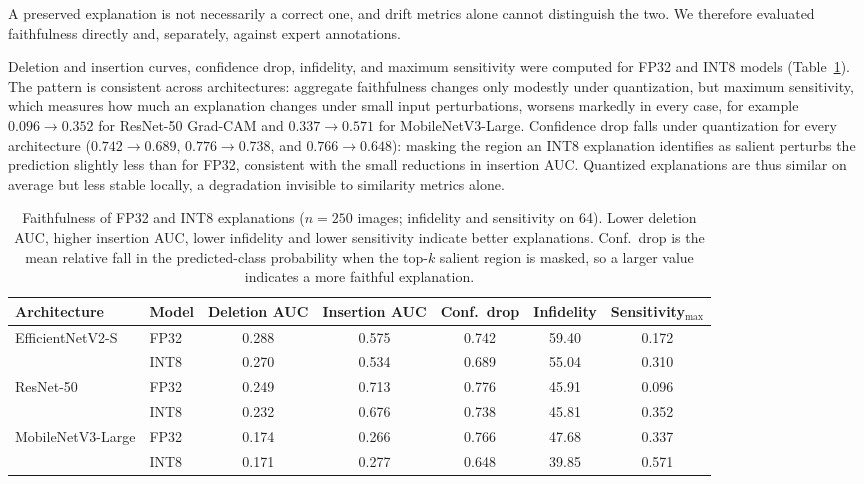 \documentclass[fleqn,10pt]{wlscirep}
\begin{document}
A preserved explanation is not necessarily a correct one, and drift metrics alone cannot distinguish the two. We therefore evaluated faithfulness directly and, separately, against expert annotations.

Deletion and insertion curves, confidence drop, infidelity, and maximum sensitivity were computed for FP32 and INT8 models (Table~\ref{tab:faithfulness}). The pattern is consistent across architectures: aggregate faithfulness changes only modestly under quantization, but maximum sensitivity, which measures how much an explanation changes under small input perturbations, worsens markedly in every case, for example $0.096 \rightarrow 0.352$ for ResNet-50 Grad-CAM and $0.337 \rightarrow 0.571$ for MobileNetV3-Large. Confidence drop falls under quantization for every architecture ($0.742 \rightarrow 0.689$, $0.776 \rightarrow 0.738$, and $0.766 \rightarrow 0.648$): masking the region an INT8 explanation identifies as salient perturbs the prediction slightly less than for FP32, consistent with the small reductions in insertion AUC. Quantized explanations are thus similar on average but less stable locally, a degradation invisible to similarity metrics alone.

\begin{table}[!ht]
\centering
\scriptsize
\caption{Faithfulness of FP32 and INT8 explanations ($n = 250$ images; infidelity and sensitivity on 64). Lower deletion AUC, higher insertion AUC, lower infidelity and lower sensitivity indicate better explanations. Conf.\ drop is the mean relative fall in the predicted-class probability when the top-$k$ salient region is masked, so a larger value indicates a more faithful explanation.}
\label{tab:faithfulness}
\setlength{\tabcolsep}{4pt}
\begin{tabular}{llccccc}
\toprule
\textbf{Architecture} & \textbf{Model} & \textbf{Deletion AUC} & \textbf{Insertion AUC} & \textbf{Conf.\ drop} & \textbf{Infidelity} & \textbf{Sensitivity$_{\max}$} \\
\midrule
\multirow{2}{*}{EfficientNetV2-S}  & FP32 & 0.288 & 0.575 & 0.742 & 59.40 & 0.172 \\
                                   & INT8 & 0.270 & 0.534 & 0.689 & 55.04 & 0.310 \\
\midrule
\multirow{2}{*}{ResNet-50}         & FP32 & 0.249 & 0.713 & 0.776 & 45.91 & 0.096 \\
                                   & INT8 & 0.232 & 0.676 & 0.738 & 45.81 & 0.352 \\
\midrule
\multirow{2}{*}{MobileNetV3-Large} & FP32 & 0.174 & 0.266 & 0.766 & 47.68 & 0.337 \\
                                   & INT8 & 0.171 & 0.277 & 0.648 & 39.85 & 0.571 \\
\bottomrule
\end{tabular}
\end{table}
\end{document}
